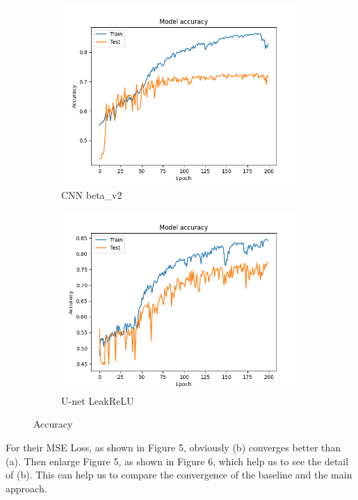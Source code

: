 \documentclass[10pt,twocolumn,letterpaper]{article}
\begin{document}
\begin{figure}[H]
  \centering
  \begin{subfigure}[b]{0.45\linewidth}
    \includegraphics[width=\linewidth]{fig7}
     \caption{CNN beta\_v2}
  \end{subfigure}
  \begin{subfigure}[b]{0.45\linewidth}
    \includegraphics[width=\linewidth]{fig4}
    \caption{U-net LeakReLU}
  \end{subfigure}
  \caption{Accuracy}
\end{figure}

For their MSE Loss, as shown in Figure 5, obviously (b) converges better than (a). Then enlarge Figure 5, as shown in Figure 6, which help us to see the detail of (b). This can help us to compare the convergence of the baseline and the main approach.
\end{document}
